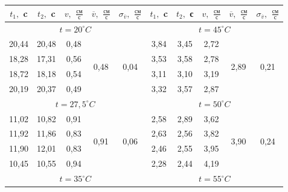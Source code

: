 \documentclass[12pt,a4paper]{article}
\begin{document}
\begin{table}[h!]
\centering
\begin{tabular}{|c|c|c|c|c||c|c|c|c|c|}
\hline
$t_{1},$ c     & $t_{2},$ c   & $v,$ $\frac{\text{см}}{\text{с}}$   &$ \overline{v},$ $\frac{\text{см}}{\text{с}}$                & $\sigma_{\overline{v}}, $ $\frac{\text{см}}{\text{с}}$                &   $t_{1},$ c   & $t_{2},$ с    & $v,$ $\frac{\text{см}}{\text{с}}$    &$ \overline{v},$  $\frac{\text{см}}{\text{с}}$               & $\sigma_{\overline{v}}, $  $\frac{\text{см}}{\text{с}}$      \\ \hline
\multicolumn{5}{|c|}{ $t = 20^\circ C$}                                              & \multicolumn{5}{c|}{$t = 45^\circ C$}    \\ \hline
20,44 & 20,48 & 0,48 & \multirow{4}{*}{0,48} & \multirow{4}{*}{0,04} & 3,84 & 3,45 & 2,72 & \multirow{4}{*}{2,89} & \multirow{4}{*}{0,21} \\ \cline{1-3} \cline{6-8}
18,28 & 17,31 & 0,56 &                       &                       & 3,53 & 3,58 & 2,78 &                       &                       \\ \cline{1-3} \cline{6-8}
18,72 & 18,18 & 0,54 &                       &                       & 3,11 & 3,10 & 3,19 &                       &                       \\ \cline{1-3} \cline{6-8}
20,19 & 20,37 & 0,49 &                       &                       & 3,32 & 3,57 & 2,87 &                       &                       \\ \hline
\multicolumn{5}{|c|}{$t = 27,5^\circ C $}                                            & \multicolumn{5}{c|}{$t = 50^\circ C $}  \\ \hline
11,02 & 10,82 & 0,91 & \multirow{4}{*}{0,91} & \multirow{4}{*}{0,06} & 2,58 & 2,89 & 3,62 & \multirow{4}{*}{3,90} & \multirow{4}{*}{0,24} \\ \cline{1-3} \cline{6-8}
11,92 & 11,86 & 0,83 &                       &                       & 2,63 & 2,56 & 3,82 &                       &                       \\ \cline{1-3} \cline{6-8}
11,90 & 12,01 & 0,83 &                       &                       & 2,46 & 2,55 & 3,95 &                       &                       \\ \cline{1-3} \cline{6-8}
10,45 & 10,55 & 0,94 &                       &                       & 2,28 & 2,44 & 4,19 &                       &                       \\ \hline
\multicolumn{5}{|c|}{$t = 35^\circ C $}                                              & \multicolumn{5}{c|}{$t = 55^\circ C $}  \\ \hline

\end{tabular}
\end{table}
\end{document}
